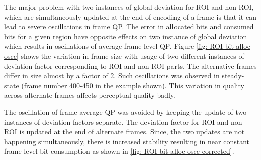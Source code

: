 \documentclass[11pt]{article} %
\begin{document}
The major problem with two instances of global deviation for ROI and non-ROI, which are simultaneously updated at the end of encoding of a frame is that it can lead to severe oscillations in frame QP. The error in allocated bits and consumed bits for a given region have opposite effects on two instance of global deviation which results in oscillations of average frame level QP. Figure \ref{fig: ROI bit-alloc oscc} shows the variation in frame size with usage of two different instances of deviation factor corresponding to ROI and non-ROI parts. The alternative frames differ in size almost by a factor of 2. Such oscillations was observed in steady-state (frame number 400-450 in the example shown). This variation in quality across alternate frames affects perceptual quality badly. 

The oscillation of frame average QP was avoided by keeping the update of two instances of deviation factors separate. The deviation factor for ROI and non-ROI is updated at the end of alternate frames. Since, the two updates are not happening simultaneously, there is increased stability resulting in near constant frame level bit consumption as shown in \ref{fig: ROI bit-alloc oscc corrected}.
\end{document}
